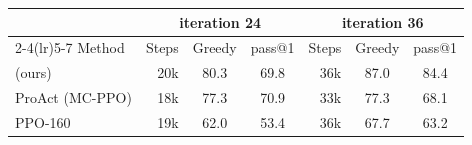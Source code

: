 \begin{tabular}{l r c c r c c}
\toprule
 & \multicolumn{3}{c}{iteration 24} & \multicolumn{3}{c}{iteration 36} \\
\cmidrule(lr){2-4}\cmidrule(lr){5-7}
Method & Steps & Greedy & pass@1 & Steps & Greedy & pass@1 \\
\midrule
\wmppo{} (ours) & 20k & 80.3 & 69.8 & 36k & 87.0 & 84.4 \\
ProAct (MC-PPO) & 18k & 77.3 & 70.9 & 33k & 77.3\sigup{} & 68.1\sigup{} \\
PPO-160 & 19k & 62.0\sigup{} & 53.4\sigup{} & 36k & 67.7\sigup{} & 63.2\sigup{} \\
\bottomrule
\end{tabular}
